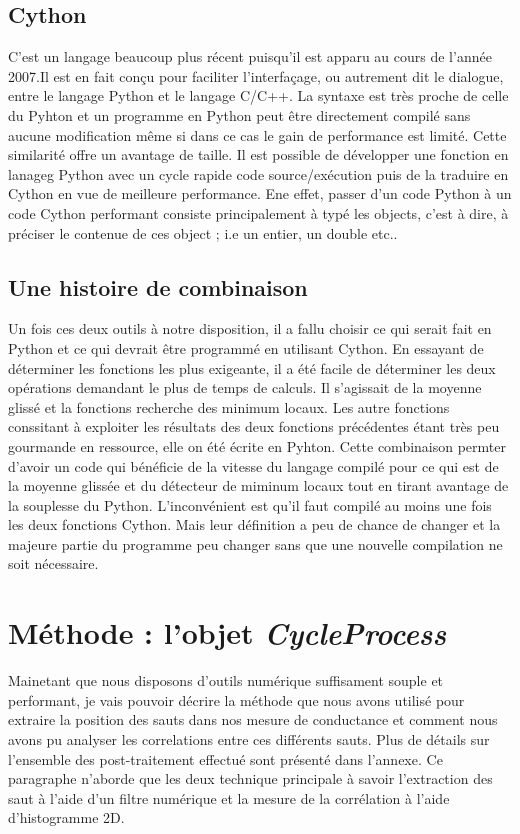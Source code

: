 \subsection{Cython}
C'est un langage beaucoup plus récent puisqu'il est apparu au cours de l'année 2007.Il est en fait conçu pour faciliter l'interfaçage, ou autrement dit le dialogue, entre le langage Python et le langage C/C++. La syntaxe est très proche de celle du Pyhton et un programme en Python peut être directement compilé sans aucune modification même si dans ce cas le gain de performance est limité. Cette similarité offre un avantage de taille. Il est possible de développer une fonction en lanageg Python avec un cycle rapide code source/exécution puis de la traduire en Cython en vue de meilleure performance. Ene effet, passer d'un code Python à un code Cython performant consiste principalement à typé les objects, c'est à dire, à préciser le contenue de ces object ; i.e un entier, un double etc.. 

\subsection{Une histoire de combinaison}
Un fois ces deux outils à notre disposition, il a fallu choisir ce qui serait fait en Python et ce qui devrait être programmé en utilisant Cython. En essayant de déterminer les fonctions les plus exigeante, il a été facile de déterminer les deux opérations demandant le plus de temps de calculs. Il s'agissait de la moyenne glissé et la fonctions recherche des minimum locaux. Les autre fonctions conssitant à exploiter les résultats des deux fonctions précédentes étant très peu gourmande en ressource, elle on été écrite en Pyhton. Cette combinaison permter d'avoir un code qui bénéficie de la vitesse du langage compilé pour ce qui est de la moyenne glissée et du détecteur de miminum locaux tout en tirant avantage de la souplesse du Python. L'inconvénient est qu'il faut compilé au moins une fois les deux fonctions Cython. Mais leur définition a peu de chance de changer et la majeure partie du programme peu changer sans que une nouvelle compilation ne soit nécessaire.


\section{Méthode : l'objet {\it CycleProcess}}
Mainetant que nous disposons d'outils numérique suffisament souple et performant, je vais pouvoir décrire la méthode que nous avons utilisé pour extraire la position des sauts dans nos mesure de conductance et comment nous avons pu analyser les correlations entre ces différents sauts. Plus de détails sur l'ensemble des post-traitement effectué sont présenté dans l'annexe. Ce paragraphe n'aborde que les deux technique principale à savoir l'extraction des saut à l'aide d'un filtre numérique et la mesure de la corrélation à l'aide d'histogramme 2D.

